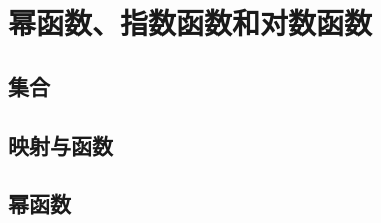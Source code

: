 \chapter{幂函数、指数函数和对数函数}

\section{集合}





\newpage
\section{映射与函数}





\newpage
\section{幂函数}




